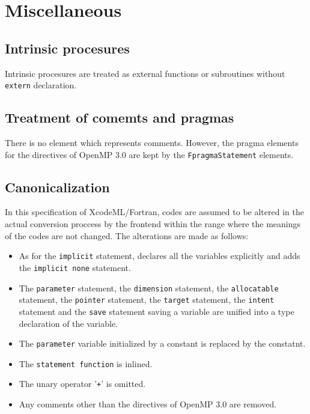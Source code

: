 \section{Miscellaneous}

\subsection{Intrinsic procesures}

Intrinsic procesures are treated as external functions or subroutines
without {\tt extern} declaration.


\subsection{Treatment of comemts and pragmas}

There is no element which represents comments. However, the pragma elements for the directives
of OpenMP 3.0 are kept by the {\tt FpragmaStatement} elements.


\subsection{Canonicalization}

In this specification of XcodeML/Fortran, codes are assumed to be altered in the actual
conversion proccess by the frontend within the range where the meanings of the codes are not changed.
The alterations are made as follows:

\begin{itemize}
\item As for the {\tt implicit} statement, declares all the variables explicitly and adds the {\tt implicit none} statement.
\item The {\tt parameter} statement, the {\tt dimension} statement, the {\tt allocatable} statement,
the {\tt pointer} statement, the {\tt target} statement, the {\tt intent} statement and the {\tt save} statement
saving a variable are unified into a type declaration of the variable.
\item The {\tt parameter} variable initialized by a constant is replaced by the constatnt.
\item The {\tt statement function} is inlined.
\item The unary operator '{\tt +}' is omitted.
\item Any comments other than the directives of OpenMP 3.0 are removed.
\end{itemize}

